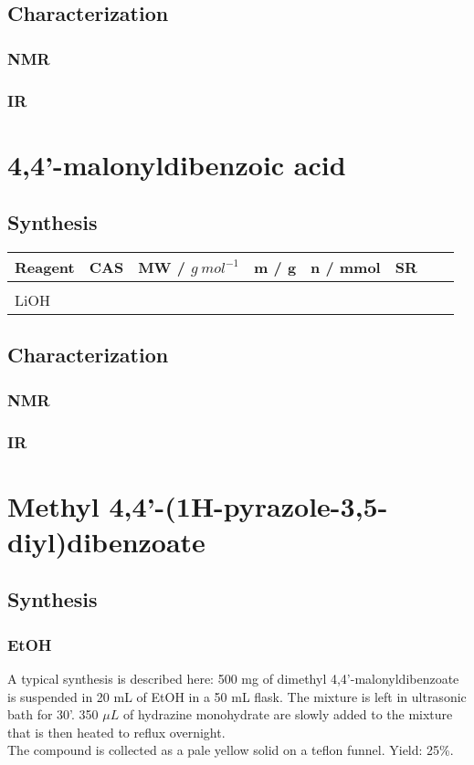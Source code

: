 \documentclass[../Master.tex]{subfiles}
\begin{document}
\subsection{Characterization}
\subsubsection{NMR}
\subsubsection{IR}
\section{4,4'-malonyldibenzoic acid}
\subsection{Synthesis}

\begin{center}
	\begin{tabular}[b]{lccccccc}
		\toprule
		Reagent & CAS & MW / \(g \ mol^{-1}\) & m / g & n / mmol & SR \\
		\midrule
		        &     &                       &       &          &    \\
		LiOH    &     &                       &       &          &    \\
		\bottomrule
	\end{tabular}
\end{center}

\subsection{Characterization}
\subsubsection{NMR}
\subsubsection{IR}
\section{Methyl 4,4'-(1H-pyrazole-3,5-diyl)dibenzoate}
\subsection{Synthesis}
\subsubsection{EtOH}
A typical synthesis is described here:
500 mg of dimethyl 4,4'-malonyldibenzoate is suspended in 20 mL of EtOH in a 50 mL flask. The mixture is left in ultrasonic bath for 30'. 350 \(\mu L\) of hydrazine monohydrate are slowly added to the mixture that is then heated to reflux overnight.\\
The compound is collected as a pale yellow solid on a teflon funnel. Yield: 25\%.
\end{document}
